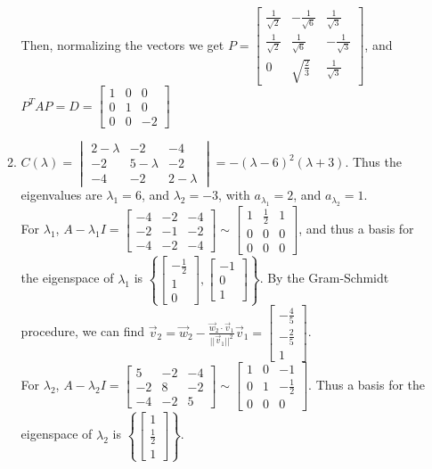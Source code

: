 \documentclass[10pt,english]{article}
\begin{document}
\begin{enumerate}
\begin{enumerate}
    Then, normalizing the vectors we get $P=\begin{bmatrix}\frac{1}{\sqrt{2}}&-\frac{1}{\sqrt{6}}&\frac{1}{\sqrt{3}}\\\frac{1}{\sqrt{2}}&\frac{1}{\sqrt{6}}&-\frac{1}{\sqrt{3}}\\0&\sqrt{\frac{2}{3}}&\frac{1}{\sqrt{3}}\end{bmatrix}$, and $P^TAP=D=\begin{bmatrix}1&0&0\\0&1&0\\0&0&-2\end{bmatrix}$
    
    \pagebreak
    \item $C(\lambda)=\begin{vmatrix}2-\lambda&-2&-4\\-2&5-\lambda&-2\\-4&-2&2-\lambda\end{vmatrix}=-(\lambda-6)^2(\lambda+3)$. Thus the eigenvalues are $\lambda_1=6$, and $\lambda_2=-3$, with $a_{\lambda_1}=2$, and $a_{\lambda_2}=1$. \\
    For $\lambda_1$, $A-\lambda_1I=\begin{bmatrix}-4&-2&-4\\-2&-1&-2\\-4&-2&-4\end{bmatrix}\sim\begin{bmatrix}1&\frac{1}{2}&1\\0&0&0\\0&0&0\end{bmatrix}$, and thus a basis for the eigenspace of $\lambda_1$ is $\left\{\begin{bmatrix}-\frac{1}{2}\\1\\0\end{bmatrix},\begin{bmatrix}-1\\0\\1\end{bmatrix}\right\}$. By the Gram-Schmidt procedure, we can find $\vec{v}_2=\vec{w}_2-\frac{\vec{w}_2\cdot\vec{v}_1}{||\vec{v}_1||^2}\vec{v}_1=\begin{bmatrix}-\frac{4}{5}\\-\frac{2}{5}\\1\end{bmatrix}$. \\ 
    For $\lambda_2$, $A-\lambda_2I=\begin{bmatrix}5&-2&-4\\-2&8&-2\\-4&-2&5\end{bmatrix}\sim\begin{bmatrix}1&0&-1\\0&1&-\frac{1}{2}\\0&0&0\end{bmatrix}$. Thus a basis for the eigenspace of $\lambda_2$ is $\left\{\begin{bmatrix}1\\\frac{1}{2}\\1\end{bmatrix}\right\}$. \\ 

\end{enumerate}
\end{enumerate}
\end{document}
